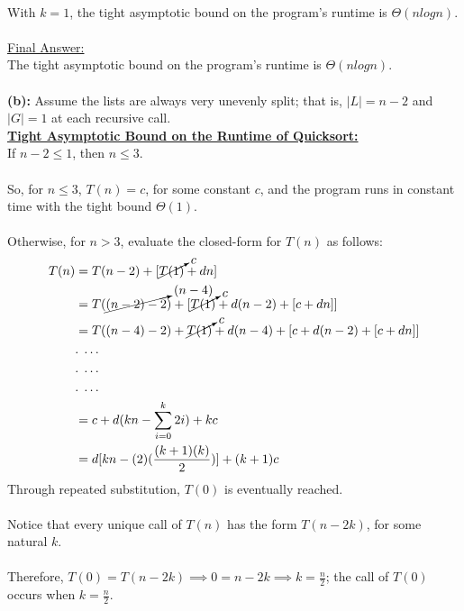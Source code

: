 \documentclass[12pt]{article}
\begin{document}
\\
With $k = 1$, the tight asymptotic bound on the program's runtime is $\Theta (n logn)$. \\
\\
\underline{Final Answer:} \\
The tight asymptotic bound on the program's runtime is $\Theta (n logn)$. \\
\\
\textbf{(b):} Assume the lists are always very unevenly split; that is, \(|L| = n - 2\) and \(|G| = 1\) at each recursive call. \\
\textbf{\underline{Tight Asymptotic Bound on the Runtime of Quicksort:}} \\
If $n - 2 \leq 1$, then $n \leq 3$. \\
\\
So, for $n \leq 3$, $T(n) = c$, for some constant $c$, and the program runs in constant time with the tight bound $\Theta (1)$. \\
\\
Otherwise, for $n > 3$, evaluate the closed-form for $T(n)$ as follows:
\begin{equation*}
    \begin{aligned}
        T(n) &= T(n - 2) + [\cancelto{c}{T(1)} + dn] \\
        &= T(\cancelto{(n - 4)}{(n - 2) - 2}) + [\cancelto{c}{T(1)} + d(n - 2) + [c + dn]] \\
        &= T((n - 4) - 2) + \cancelto{c}{T(1)} + d(n - 4) + [c + d(n - 2) + [c + dn]] \\
        &. \; \dots \\
        &. \; \dots \\
        &. \; \dots \\
        &= c + d(kn - \sum_{i = 0}^{k} 2i) + kc \\
        &= d[kn - (2)(\frac{(k + 1)(k)}{2})] + (k + 1)c
    \end{aligned}
\end{equation*}
Through repeated substitution, $T(0)$ is eventually reached. \\
\\
Notice that every unique call of $T(n)$ has the form $T(n - 2k)$, for some natural $k$. \\
\\
Therefore, $T(0) = T(n - 2k) \implies 0 = n - 2k \implies k = \frac{n}{2}$; the call of $T(0)$ occurs when $k = \frac{n}{2}$. \\
\\
\end{document}
